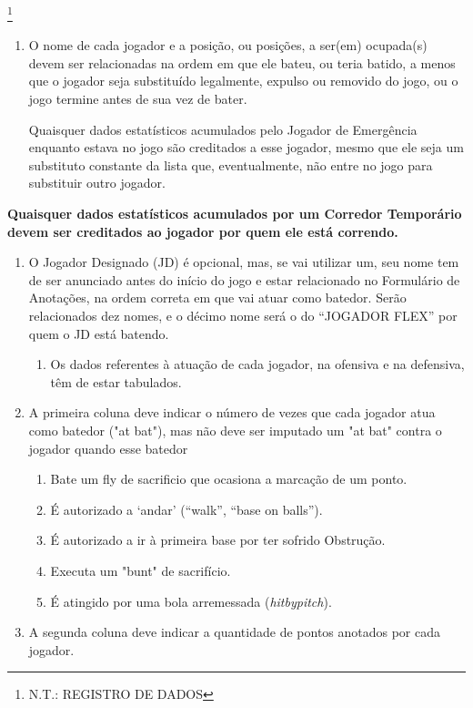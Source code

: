 \footnote{N.T.: REGISTRO DE DADOS }
\begin{multicols}{2}

	\begin{enumerate}[label=\alph*)]
		\item O nome de cada jogador e a posição, ou posições, a ser(em) ocupada(s) devem ser relacionadas na ordem em que ele bateu, ou teria batido, a menos que o jogador seja substituído legalmente, expulso ou removido do jogo, ou o jogo termine antes de sua vez de bater.

		Quaisquer dados estatísticos acumulados pelo Jogador de Emergência enquanto estava no jogo são creditados a esse jogador, mesmo que ele seja um substituto constante da lista que, eventualmente, não entre no jogo para substituir outro jogador.
	\end{enumerate}
	\textbf{Quaisquer dados estatísticos acumulados por um Corredor Temporário devem ser creditados ao jogador por quem ele está correndo.}
	\begin{enumerate}[label= \arabic*)]
		\item  O Jogador Designado (JD) é opcional, mas, se vai utilizar um, seu nome tem de ser anunciado antes do início do jogo e estar relacionado no Formulário de Anotações, na ordem correta em que vai atuar como batedor. Serão relacionados dez nomes, e o décimo nome será o do “JOGADOR FLEX” por quem o JD está batendo.
		\begin{enumerate}[label=(\alph*)]
			\item Os dados referentes à atuação de cada jogador, na ofensiva e na defensiva, têm de
			estar tabulados.
		\end{enumerate}
		\item A primeira coluna deve indicar o número de vezes que cada jogador atua como batedor ("at bat"), mas não deve ser imputado um "at bat" contra o jogador quando esse batedor
		\begin{enumerate}[label= (\alph*)]
			\item Bate um \gls{fly de sacrificio} que ocasiona a marcação de um ponto.
			\item É autorizado a ‘andar’ (“walk”, “base on balls”).
			\item É autorizado a ir à primeira base por ter sofrido Obstrução.
			\item Executa um "bunt" de sacrifício.
			\item É atingido por uma bola arremessada (\textit{hitbypitch}).
		\end{enumerate}
		\item A segunda coluna deve indicar a quantidade de pontos anotados por cada jogador.

\end{enumerate}
\end{multicols}
